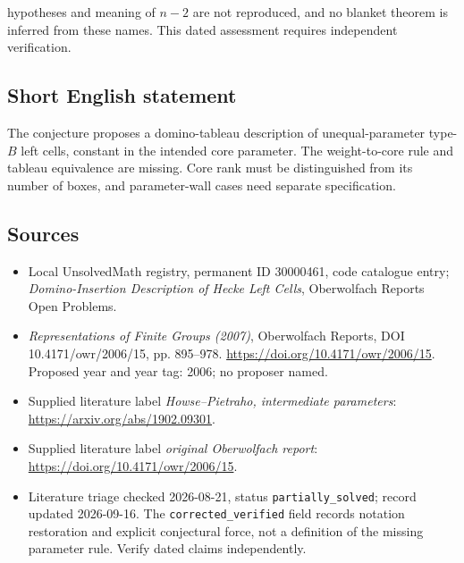\documentclass[11pt]{article}
\begin{document}
hypotheses and meaning of \(n-2\) are not reproduced, and no blanket theorem is inferred from these names. This dated assessment requires independent verification.
\subsection{Short English statement}
The conjecture proposes a domino-tableau description of unequal-parameter type-\(B\) left cells, constant in the intended core parameter. The weight-to-core rule and tableau equivalence are missing. Core rank must be distinguished from its number of boxes, and parameter-wall cases need separate specification.
\subsection{Sources}
\begin{itemize}\item Local UnsolvedMath registry, permanent ID 30000461, code catalogue entry; \emph{Domino-Insertion Description of Hecke Left Cells}, Oberwolfach Reports Open Problems.\item \emph{Representations of Finite Groups (2007)}, Oberwolfach Reports, DOI 10.4171/owr/2006/15, pp. 895--978. \url{https://doi.org/10.4171/owr/2006/15}. Proposed year and year tag: 2006; no proposer named.\item Supplied literature label \emph{Howse--Pietraho, intermediate parameters}: \url{https://arxiv.org/abs/1902.09301}.\item Supplied literature label \emph{original Oberwolfach report}: \url{https://doi.org/10.4171/owr/2006/15}.\item Literature triage checked 2026-08-21, status \texttt{partially\_solved}; record updated 2026-09-16. The \texttt{corrected\_verified} field records notation restoration and explicit conjectural force, not a definition of the missing parameter rule. Verify dated claims independently.\end{itemize}
\end{document}
